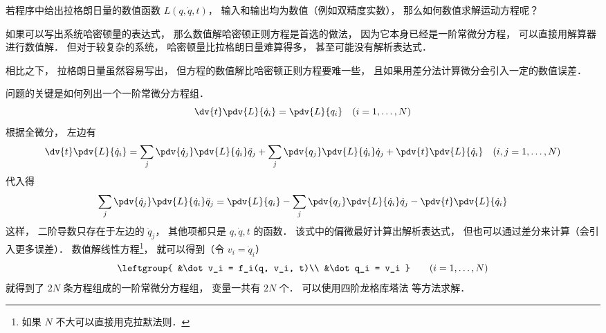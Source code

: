 
\begin{issues}
\issueDraft
\end{issues}


若程序中给出拉格朗日量的数值函数 $L(q, \dot q, t)$， 输入和输出均为数值（例如双精度实数）， 那么如何数值求解运动方程呢？

如果可以写出系统哈密顿量的表达式， 那么数值解哈密顿正则方程是首选的做法， 因为它本身已经是一阶常微分方程， 可以直接用解算器进行数值解． 但对于较复杂的系统， 哈密顿量比拉格朗日量难算得多， 甚至可能没有解析表达式．

相比之下， 拉格朗日量虽然容易写出， 但方程的数值解比哈密顿正则方程要难一些， 且如果用差分法计算微分会引入一定的数值误差．

问题的关键是如何列出一个一阶常微分方程组．
\begin{equation}
\dv{t} \pdv{L}{\dot q_i} = \pdv{L}{q_i}
\quad (i=1,\dots,N)
\end{equation}
根据全微分， 左边有
\begin{equation}
\dv{t} \pdv{L}{\dot q_i} = \sum_j\pdv{\dot q_j}\pdv{L}{\dot q_i}\ddot q_j + \sum_j\pdv{q_j}\pdv{L}{\dot q_i}\dot q_j + \pdv{t}\pdv{L}{\dot q_i} \quad (i,j=1,\dots,N)
\end{equation}
代入得
\begin{equation}
\sum_j\pdv{\dot q_j}\pdv{L}{\dot q_i}\ddot q_j = \pdv{L}{q_i} - \sum_j\pdv{q_j}\pdv{L}{\dot q_i}\dot q_j - \pdv{t}\pdv{L}{\dot q_i}
\end{equation}
这样， 二阶导数只存在于左边的 $\ddot q_j$， 其他项都只是 $q,\dot q, t$ 的函数． 该式中的偏微最好计算出解析表达式， 但也可以通过差分来计算（会引入更多误差）． 数值解线性方程\footnote{如果 $N$ 不大可以直接用克拉默法则．}， 就可以得到（令 $v_i = \dot q_i$）
\begin{equation}
\leftgroup{
&\dot v_i = f_i(q, v_i, t)\\
&\dot q_i = v_i
}\qquad (i = 1,\dots,N)
\end{equation}
就得到了 $2N$ 条方程组成的一阶常微分方程组， 变量一共有 $2N$ 个． 可以使用四阶龙格库塔法 等方法求解．

